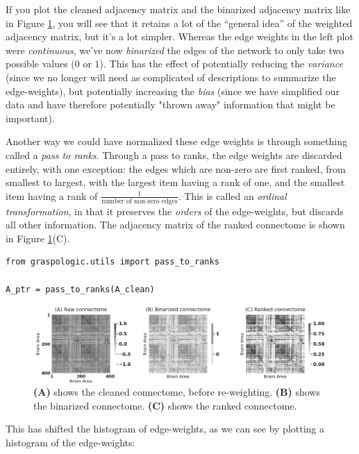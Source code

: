 If you plot the cleaned adjacency matrix and the binarized adjacency matrix like in Figure \ref{fig:ch2:cleaned_connectomes}, you will see that it retains a lot of the ``general idea'' of the weighted adjacency matrix, but it's a lot simpler. Whereas the edge weights in the left plot were \emph{continuous}, we've now \emph{binarized} the edges of the network to only take two possible values ($0$ or $1$). This has the effect of potentially reducing the \emph{variance} (since we no longer will need as complicated of descriptions to summarize the edge-weights), but potentially increasing the \emph{bias} (since we have simplified our data and have therefore potentially "thrown away" information that might be important).

Another way we could have normalized these edge weights is through something called a \emph{pass to ranks}. Through a pass to ranks, the edge weights are discarded entirely, with one exception: the edges which are non-zero are first ranked, from smallest to largest, with the largest item having a rank of one, and the smallest item having a rank of $\frac{1}{\text{number of non-zero edges}}$. This is called an \emph{ordinal transformation}, in that it preserves the \emph{orders} of the edge-weights, but discards all other information. The adjacency matrix of the ranked connectome is shown in Figure \ref{fig:ch2:cleaned_connectomes}(C).

\begin{lstlisting}[style=python]
from graspologic.utils import pass_to_ranks

A_ptr = pass_to_ranks(A_clean)
\end{lstlisting}
\begin{figure}[h]
    \centering
    \includegraphics[width=\linewidth]{foundations/ch2/Images/cleaning_connectomes.png}
    \caption[Re-weighting connectome edge-weights]{\textbf{(A)} shows the cleaned connectome, before re-weighting. \textbf{(B)} shows the binarized connectome. \textbf{(C)} shows the ranked connectome.}
    \label{fig:ch2:cleaned_connectomes}
\end{figure}

This has shifted the histogram of edge-weights, as we can see by plotting a histogram of the edge-weights:

